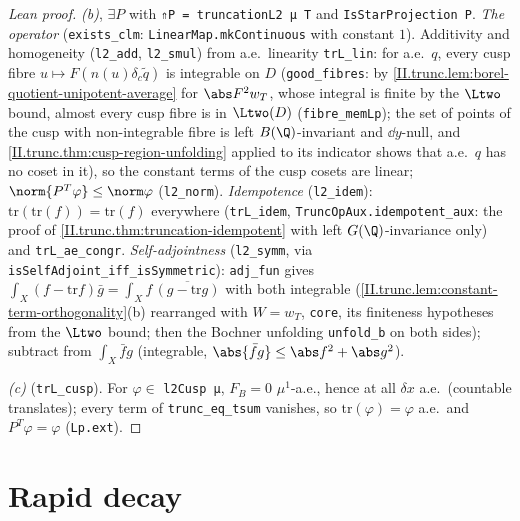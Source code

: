 \begin{proof}[Lean proof]
\emph{(b)}, $\exists P$ with \texttt{⇑P = truncationL2 μ T} and \texttt{IsStarProjection P}. \emph{The operator} (\texttt{exists\_clm}: \texttt{LinearMap.mkContinuous} with constant $1$). Additivity and homogeneity (\texttt{l2\_add}, \texttt{l2\_smul}) from a.e.\ linearity \texttt{trL\_lin}: for a.e.\ $q$, every cusp fibre $u\mapsto F(n(u)\delta_c\tilde q)$ is integrable on $D$ (\texttt{good\_fibres}: by \cref{II.trunc.lem:borel-quotient-unipotent-average} for $\abs F^2w_T$, whose integral is finite by the $\Ltwo$ bound, almost every cusp fibre is in $\Ltwo(D)$ (\texttt{fibre\_memLp}); the set of points of the cusp with non-integrable fibre is left $B(\Q)$-invariant and $\dd y$-null, and \cref{II.trunc.thm:cusp-region-unfolding} applied to its indicator shows that a.e.\ $q$ has no coset in it), so the constant terms of the cusp cosets are linear; $\norm{P^T\varphi}\le\norm\varphi$ (\texttt{l2\_norm}). \emph{Idempotence} (\texttt{l2\_idem}): $\mathrm{tr}(\mathrm{tr}(f))=\mathrm{tr}(f)$ everywhere (\texttt{trL\_idem}, \texttt{TruncOpAux.idempotent\_aux}: the proof of \cref{II.trunc.thm:truncation-idempotent} with left $G(\Q)$-invariance only) and \texttt{trL\_ae\_congr}. \emph{Self-adjointness} (\texttt{l2\_symm}, via \texttt{isSelfAdjoint\_iff\_isSymmetric}): \texttt{adj\_fun} gives $\int_X(f-\mathrm{tr}f)\bar g=\int_Xf\,\overline{(g-\mathrm{tr}g)}$ with both integrable (\cref{II.trunc.lem:constant-term-orthogonality}(b) rearranged with $W=w_T$, \texttt{core}, its finiteness hypotheses from the $\Ltwo$ bound; then the Bochner unfolding \texttt{unfold\_b} on both sides); subtract from $\int_X\bar fg$ (integrable, $\abs{\bar fg}\le\abs f^2+\abs g^2$).

\emph{(c)} (\texttt{trL\_cusp}). For $\varphi\in$ \texttt{l2Cusp μ}, $F_B=0$ $\mu^1$-a.e., hence at all $\delta x$ a.e.\ (countable translates); every term of \texttt{trunc\_eq\_tsum} vanishes, so $\mathrm{tr}(\varphi)=\varphi$ a.e.\ and $P^T\varphi=\varphi$ (\texttt{Lp.ext}).
\end{proof}


\section{Rapid decay}\label{sec:trunc-decay}


